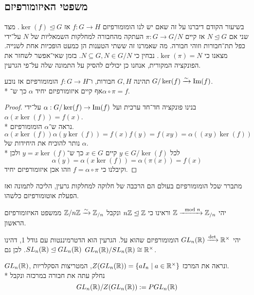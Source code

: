 \subsection{משפטי האיזומורפיזם}
בשיעור הקודם דיברנו על זה שאם יש לנו הומומורפיזם $f : G \to H$ אז $\ker(f) \trianglelefteq G$.
מצד שני אם $N \trianglelefteq G$ אז קיים $\pi : G \to G/N$ העתקה מהחבורה למחלקות השמאליות של $N$ על־ידי כפל תת־חבורות וזוהי חבורה.
מה שאמרנו זה ששתי הטענות הן כמעט הופכיות אחת לשנייה. מצאנו כי $\ker(\pi) = N$.
נבחין כי $N \subseteq G, N \in G/N$.
בזמן שאי־אפשר לשחזר את הפונקציה המקורית, אנחנו כן יכולים להסיק על התמונה שלה על־פי הגרעין.

\begin{theorem}
	תהינה $G, H$ חבורות, ו־$f : G \to H$ הומומורפיזם אז נובע $G/\ker(f) \xrightarrow{\sim} \operatorname{Im}(f)$. \\*
	אף קיים איזומורפיזם יחיד $\alpha$ כך ש־$\alpha \circ \pi = f$.
\end{theorem}
\begin{proof}
	בנינו פונקציה חד־חד ערכית ועל $\alpha : G/\ker(f) \to \operatorname{Im}(f)$ על־ידי $\alpha(x \ker(f)) = f(x)$. \\*
	נראה ש־$\alpha$ הומומורפיזם.
	\[
		\alpha(x \ker(f)) \alpha(y \ker(f)) = f(x) f(y) = f(xy) = \alpha((xy) \ker(f))
	\]
	נותר להוכיח את היחידות של $\alpha$. \\*
	לכל $y \in G/\ker(f)$ קיים $x \in G$ כך ש־$y = x \ker(f)$ ולכן
	\[
		\alpha(y) = \alpha(x \ker(f)) = \alpha(\pi(x)) = f(x)
	\]
	וקיבלנו כי $f = \alpha \circ \pi$ וזהו אכן איזומורפיזם יחיד.
\end{proof}
מתברר שכל הומומורפיזם בעולם הם הרכבה של חלוקה למחלקות גרעין, הליכה לתמונה ואז הפעלת אוטומורפיזם כלשהו.
\begin{example}
	יהי $\mathbb{Z} \xrightarrow{\mod n} \mathbb{Z}_{/n}$ וראינו כי $n\mathbb{Z} \trianglelefteq \mathbb{Z}$ ונקבל $\mathbb{Z} / n\mathbb{Z} \xrightarrow{\sim} \mathbb{Z}_{/n}$ ממשפט האיזומורפיזם הראשון.
\end{example}
\begin{example}
	יהי $GL_n(\mathbb{R}) \xrightarrow{\det} \mathbb{R}^\times$ הומומורפיזם שהוא על. הגרעין הוא הדטרמיננטות עם גודל 1, דהינו $SL_n(\mathbb{R}) \trianglelefteq GL_n(\mathbb{R})$.
	לכן גם $GL_n(\mathbb{R}) / SL_n(\mathbb{R}) \cong \mathbb{R}^\times$.
\end{example}
\begin{example}
	$GL_n(\mathbb{R})$, ונראה את המרכז $Z(GL_n(\mathbb{R})) = \{ a I_n \mid a \in \mathbb{R}^\times \}$, המטריצות הסקלריות. \\*
	 נחלק עתה את חבורה במרכזה ונקבל
	 \[
		 GL_n(\mathbb{R}) / Z(GL_n(\mathbb{R})) := PGL_n(\mathbb{R})
	 \]
\end{example}
